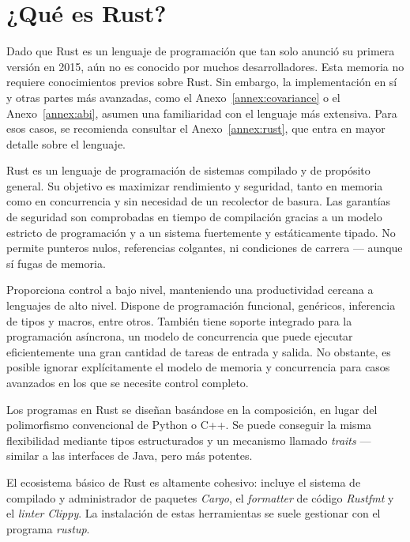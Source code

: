 
\chapter{¿Qué es Rust?}\label{ch:rust}

Dado que Rust es un lenguaje de programación que tan solo anunció su primera
versión en 2015, aún no es conocido por muchos desarrolladores. Esta memoria no
requiere conocimientos previos sobre Rust. Sin embargo, la implementación en sí
y otras partes más avanzadas, como el Anexo~\ref{annex:covariance} o el
Anexo~\ref{annex:abi}, asumen una familiaridad con el lenguaje más extensiva.
Para esos casos, se recomienda consultar el Anexo~\ref{annex:rust}, que entra en
mayor detalle sobre el lenguaje.

Rust es un lenguaje de programación de sistemas compilado y de propósito
general. Su objetivo es maximizar rendimiento y seguridad, tanto en memoria como
en concurrencia y sin necesidad de un recolector de basura. Las garantías de
seguridad son comprobadas en tiempo de compilación gracias a un modelo estricto
de programación y a un sistema fuertemente y estáticamente tipado. No permite
punteros nulos, referencias colgantes, ni condiciones de carrera --- aunque sí
fugas de memoria.

Proporciona control a bajo nivel, manteniendo una productividad cercana a
lenguajes de alto nivel. Dispone de programación funcional, genéricos,
inferencia de tipos y macros, entre otros. También tiene soporte integrado para
la programación asíncrona, un modelo de concurrencia que puede ejecutar
eficientemente una gran cantidad de tareas de entrada y salida. No obstante, es
posible ignorar explícitamente el modelo de memoria y concurrencia para casos
avanzados en los que se necesite control completo.

Los programas en Rust se diseñan basándose en la composición, en lugar del
polimorfismo convencional de Python o C++. Se puede conseguir la misma
flexibilidad mediante tipos estructurados y un mecanismo llamado \emph{traits}
--- similar a las interfaces de Java, pero más potentes.

El ecosistema básico de Rust es altamente cohesivo: incluye el sistema de
compilado y administrador de paquetes \emph{Cargo}, el \emph{formatter} de
código \emph{Rustfmt} y el \emph{linter} \emph{Clippy}. La instalación de estas
herramientas se suele gestionar con el programa \emph{rustup}.
